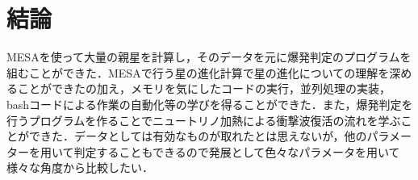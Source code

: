 \chapter{結論}
\label{chap:conclusion}

MESAを使って大量の親星を計算し，そのデータを元に爆発判定のプログラムを組むことができた．MESAで行う星の進化計算で星の進化についての理解を深めることができたの加え，メモリを気にしたコードの実行，並列処理の実装，bashコードによる作業の自動化等の学びを得ることができた．また，爆発判定を行うプログラムを作ることでニュートリノ加熱による衝撃波復活の流れを学ぶことができた．データとしては有効なものが取れたとは思えないが，他のパラメーターを用いて判定することもできるので発展として色々なパラメータを用いて様々な角度から比較したい．
